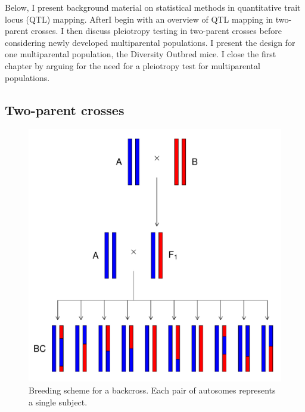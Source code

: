 \documentclass[]{article}\usepackage[]{graphicx}\usepackage[]{color}
\makeatletter
\def\maxwidth{ %
  \ifdim\Gin@nat@width>\linewidth
    \linewidth
  \else
    \Gin@nat@width
  \fi
}
\newenvironment{knitrout}{}{} %
\def\maxwidth{\ifdim\Gin@nat@width>\linewidth\linewidth\else\Gin@nat@width\fi}
\makeatother
\begin{document}
Below, I present background material on statistical methods in quantitative trait locus
(QTL) mapping.
AfterI begin with an overview of
QTL mapping in two-parent crosses.
I then discuss pleiotropy testing in two-parent crosses before considering newly
developed multiparental populations.
I present the design for one multiparental population, the Diversity Outbred mice.
I close the first chapter by arguing for the need for a pleiotropy test for multiparental populations.


\subsection{Two-parent crosses}

\begin{knitrout}
\color{fgcolor}\begin{figure}
\includegraphics[width=\maxwidth]{figure/backcross-1} \caption[Breeding scheme for a backcross]{Breeding scheme for a backcross. Each pair of autosomes represents a single subject.}\label{fig:backcross}
\end{figure}


\end{knitrout}
\end{document}
